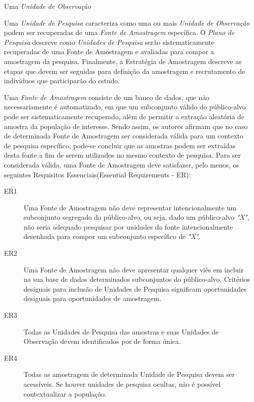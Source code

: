 Uma \textit{Unidade de Observação}~\cite{wohlin2012experimentation}

Uma \textit{Unidade de Pesquisa} caracteriza como uma ou mais \textit{Unidade de
	Observação} podem ser recuperadas de uma \textit{Fonte de Amostragem}
específica. O \textit{Plano de Pesquisa} descreve como \textit{Unidades de
	Pesquisa} serão sistematicamente recuperadas de uma Fonte de Amostragem e
avaliadas para compor a amostragem da pesquisa. Finalmente, a Estratégia de
Amostragem descreve as etapas que devem ser seguidas para definição da
amostragem e recrutamento de indivíduos que participarão do estudo.

Uma \textit{Fonte de Amostragem} consiste de um banco de dados, que não
necessariamente é automatizado, em que um subconjunto válido do público-alvo
pode ser sistematicamente recuperado, além de permitir a extração aleatória de
amostra da população de interesse. Sendo assim, os autores afirmam que no caso
de determinada Fonte de Amostragem ser considerada válida para um contexto de
pesquisa específico, pode-se concluir que as amostras podem ser extraídas desta
fonte a fim de serem utilizados no mesmo contexto de pesquisa. Para ser
considerada válida, uma Fonte de Amostragem deve satisfazer, pelo menos, os
seguintes Requisitos Essenciais(Essential Requirements - ER):

\begin{description}
	\item[ER1] Uma Fonte de Amostragem não deve representar intencionalmente um
		subconjunto segregado do público-alvo, ou seja, dado um público-alvo
		\textit{"X"}, não seria adequado pesquisar por unidades da fonte
		intencionalmente desenhada para compor um subconjunto específico de
		\textit{"X"}.
	\item[ER2] Uma Fonte de Amostragem não deve apresentar qualquer viés em
		incluir na sua base de dados determinados subconjuntos do público-alvo.
		Critérios desiguais para inclusão de Unidades de Pesquisa significam
		oportunidades desiguais para oportunidades de amostragem.
	\item[ER3] Todas as Unidades de Pesquisa das amostras e suas Unidades de
		Observação devem identificados por de forma única.
	\item[ER4] Todas as amostragem de determinada Unidade de Pesquisa devem ser
		acessíveis. Se houver unidades de pesquisa ocultas, não é possível
		contextualizar a população.
\end{description}

